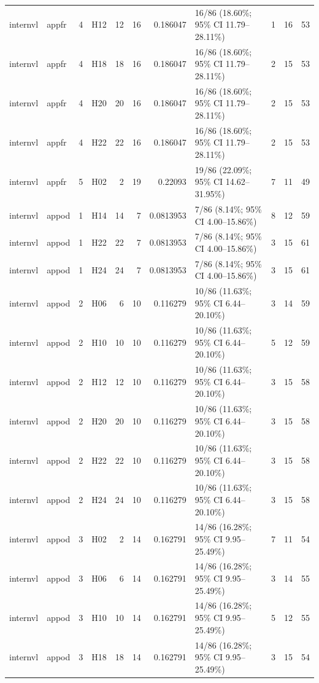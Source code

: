 \begin{table}[tbp]
\begin{tabular}{llrlrrrlrrr}
internvl & appfr & 4 & H12 & 12 & 16 & 0.186047 & 16/86 (18.60\%; 95\% CI 11.79–28.11\%) & 1 & 16 & 53 \\
internvl & appfr & 4 & H18 & 18 & 16 & 0.186047 & 16/86 (18.60\%; 95\% CI 11.79–28.11\%) & 2 & 15 & 53 \\
internvl & appfr & 4 & H20 & 20 & 16 & 0.186047 & 16/86 (18.60\%; 95\% CI 11.79–28.11\%) & 2 & 15 & 53 \\
internvl & appfr & 4 & H22 & 22 & 16 & 0.186047 & 16/86 (18.60\%; 95\% CI 11.79–28.11\%) & 2 & 15 & 53 \\
internvl & appfr & 5 & H02 & 2 & 19 & 0.22093 & 19/86 (22.09\%; 95\% CI 14.62–31.95\%) & 7 & 11 & 49 \\
internvl & appod & 1 & H14 & 14 & 7 & 0.0813953 & 7/86 (8.14\%; 95\% CI 4.00–15.86\%) & 8 & 12 & 59 \\
internvl & appod & 1 & H22 & 22 & 7 & 0.0813953 & 7/86 (8.14\%; 95\% CI 4.00–15.86\%) & 3 & 15 & 61 \\
internvl & appod & 1 & H24 & 24 & 7 & 0.0813953 & 7/86 (8.14\%; 95\% CI 4.00–15.86\%) & 3 & 15 & 61 \\
internvl & appod & 2 & H06 & 6 & 10 & 0.116279 & 10/86 (11.63\%; 95\% CI 6.44–20.10\%) & 3 & 14 & 59 \\
internvl & appod & 2 & H10 & 10 & 10 & 0.116279 & 10/86 (11.63\%; 95\% CI 6.44–20.10\%) & 5 & 12 & 59 \\
internvl & appod & 2 & H12 & 12 & 10 & 0.116279 & 10/86 (11.63\%; 95\% CI 6.44–20.10\%) & 3 & 15 & 58 \\
internvl & appod & 2 & H20 & 20 & 10 & 0.116279 & 10/86 (11.63\%; 95\% CI 6.44–20.10\%) & 3 & 15 & 58 \\
internvl & appod & 2 & H22 & 22 & 10 & 0.116279 & 10/86 (11.63\%; 95\% CI 6.44–20.10\%) & 3 & 15 & 58 \\
internvl & appod & 2 & H24 & 24 & 10 & 0.116279 & 10/86 (11.63\%; 95\% CI 6.44–20.10\%) & 3 & 15 & 58 \\
internvl & appod & 3 & H02 & 2 & 14 & 0.162791 & 14/86 (16.28\%; 95\% CI 9.95–25.49\%) & 7 & 11 & 54 \\
internvl & appod & 3 & H06 & 6 & 14 & 0.162791 & 14/86 (16.28\%; 95\% CI 9.95–25.49\%) & 3 & 14 & 55 \\
internvl & appod & 3 & H10 & 10 & 14 & 0.162791 & 14/86 (16.28\%; 95\% CI 9.95–25.49\%) & 5 & 12 & 55 \\
internvl & appod & 3 & H18 & 18 & 14 & 0.162791 & 14/86 (16.28\%; 95\% CI 9.95–25.49\%) & 3 & 15 & 54 \\

\end{tabular}
\end{table}
